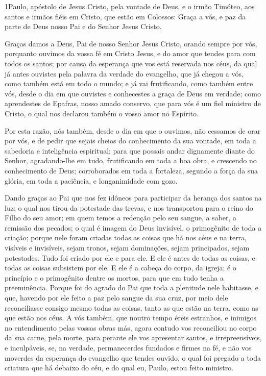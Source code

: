 
\lettrine{1} Paulo, apóstolo de Jesus Cristo, pela vontade de
Deus, e o irmão Timóteo, aos santos e irmãos fiéis em Cristo,
que estão em Colossos: Graça a vós, e paz da parte de Deus nosso Pai
e do Senhor Jesus Cristo.

Graças damos a Deus, Pai de nosso Senhor Jesus Cristo, orando
sempre por vós, porquanto ouvimos da vossa fé em Cristo Jesus, e
do amor que tendes para com todos os santos; por causa da
esperança que vos está reservada nos céus, da qual já antes ouvistes
pela palavra da verdade do evangelho, que já chegou a vós, como
também está em todo o mundo; e já vai frutificando, como também
entre vós, desde o dia em que ouvistes e conhecestes a graça de Deus
em verdade; como aprendestes de Epafras, nosso amado conservo,
que para vós é um fiel ministro de Cristo, o qual nos declarou
também o vosso amor no Espírito.

Por esta razão, nós também, desde o dia em que o ouvimos, não
cessamos de orar por vós, e de pedir que sejais cheios do
conhecimento da sua vontade, em toda a sabedoria e inteligência
espiritual; para que possais andar dignamente diante do
Senhor, agradando-lhe em tudo, frutificando em toda a boa obra, e
crescendo no conhecimento de Deus; corroborados em toda a
fortaleza, segundo a força da sua glória, em toda a paciência, e
longanimidade com gozo.

Dando graças ao Pai que nos fez idôneos para participar da
herança dos santos na luz; o qual nos tirou da potestade das
trevas, e nos transportou para o reino do Filho do seu amor;
em quem temos a redenção pelo seu sangue, a saber, a remissão
dos pecados; o qual é imagem do Deus invisível, o primogênito
de toda a criação; porque nele foram criadas todas as coisas
que há nos céus e na terra, visíveis e invisíveis, sejam tronos,
sejam dominações, sejam principados, sejam potestades. Tudo foi
criado por ele e para ele. E ele é antes de todas as coisas,
e todas as coisas subsistem por ele. E ele é a cabeça do
corpo, da igreja; é o princípio e o primogênito dentre os mortos,
para que em tudo tenha a preeminência. Porque foi do agrado
do Pai que toda a plenitude nele habitasse, e que, havendo
por ele feito a paz pelo sangue da sua cruz, por meio dele
reconciliasse consigo mesmo todas as coisas, tanto as que estão na
terra, como as que estão nos céus. A vós também, que noutro
tempo éreis estranhos, e inimigos no entendimento pelas vossas obras
más, agora contudo vos reconciliou no corpo da sua carne,
pela morte, para perante ele vos apresentar santos, e
irrepreensíveis, e inculpáveis, se, na verdade, permanecerdes
fundados e firmes na fé, e não vos moverdes da esperança do
evangelho que tendes ouvido, o qual foi pregado a toda criatura que
há debaixo do céu, e do qual eu, Paulo, estou feito ministro.

